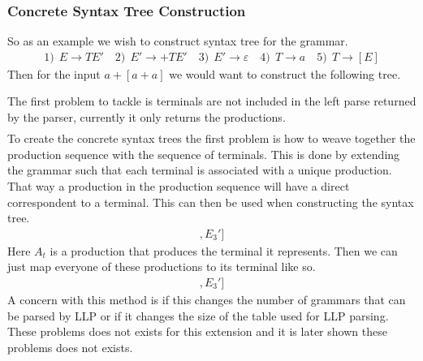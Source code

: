 \documentclass[a4paper,12pt]{article}
\theoremstyle{definition}
\begin{document}
\subsubsection{Concrete Syntax Tree Construction}
So as an example we wish to construct syntax tree for the grammar.
\begin{gather*}
  1)\:\: E \to TE' \quad 2)\:\: E' \to +TE' \quad 3)\:\: E' \to \varepsilon \quad 4)\:\: T \to a \quad 5) \: \: T \to [E]
\end{gather*}
Then for the input $a+[a + a]$ we would want to construct the following tree.
\begin{center}
\end{center}
The first problem to tackle is terminals are not included in the left parse returned by the parser, currently it only returns the productions.
\begin{gather*}
  [E_1, T_4, E_2', T_5, E_1, T_4, E_2', T_4, E_3', E_3']
\end{gather*}
To create the concrete syntax trees the first problem is how to weave together the production sequence with the sequence of terminals. This is done by extending the grammar such that each terminal is associated with a unique production. That way a production in the production sequence will have a direct correspondent to a terminal. This can then be used when constructing the syntax tree.
\begin{gather*}
  [E_1, T_4, A_a, E_2', A_+, T_5, A_[, E_1, T_4, A_a, E_2', A_+, T_4, A_a, E_3', A_], E_3']
\end{gather*}
Here $A_t$ is a production that produces the terminal it represents. Then we can just map everyone of these productions to its terminal like so.
\begin{gather*}
  [E_1, T_4, a, E_2', +, T_5, [, E_1, T_4, a, E_2', +, T_4, a, E_3', ], E_3']
\end{gather*}
A concern with this method is if this changes the number of grammars that can be parsed by LLP or if it changes the size of the table used for LLP parsing. These problems does not exists for this extension and it is later shown these problems does not exists.
\end{document}
